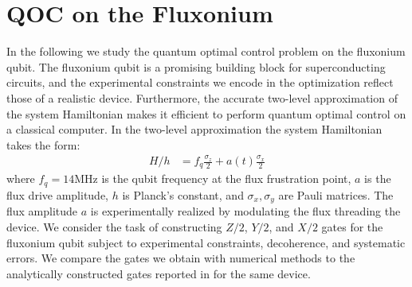 \section{QOC on the Fluxonium \label{sec:fluxonium}}
In the following we study
the quantum optimal control problem on the fluxonium qubit.
The fluxonium qubit is a promising building block for superconducting
circuits, and the experimental constraints we encode in the optimization reflect
those of a realistic device. Furthermore, the accurate
two-level approximation of the system Hamiltonian makes it
efficient to perform quantum optimal control on
a classical computer. In the two-level
approximation the system Hamiltonian takes the form:
\begin{align}
  H/h &= f_{q} \frac{\sigma_{z}}{2} + a(t) \frac{\sigma_{x}}{2}
  \label{eq:hamiltonian}
\end{align}
where $f_{q} = 14$MHz is the qubit frequency at the flux frustration point,
$a$ is the flux drive amplitude, $h$ is Planck's constant, and $\sigma_{x}, \sigma_{y}$
are Pauli matrices. The flux amplitude $a$ is experimentally
realized by modulating the flux 
threading the device. We consider the task of constructing $Z/2$, $Y/2$, and $X/2$
gates for the fluxonium qubit subject to experimental constraints, decoherence, and
systematic errors. We compare the gates we obtain with numerical
methods to the analytically constructed gates reported in
\cite{zhang2020universal} for the same device.

